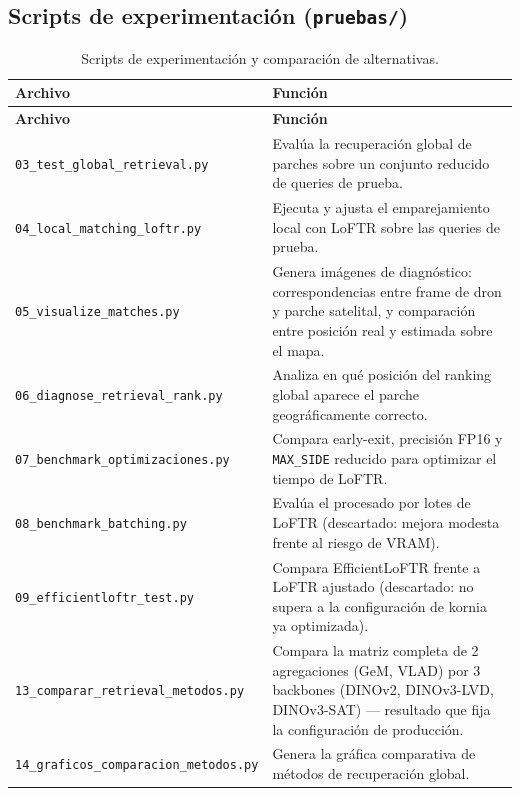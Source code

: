 \subsection*{Scripts de experimentación (\texttt{pruebas/})}

\begin{longtable}{p{}p{}}
\caption{Scripts de experimentación y comparación de alternativas.}\label{tab:scripts-pruebas}\\
\toprule
\textbf{Archivo} & \textbf{Función} \\
\midrule
\endfirsthead
\toprule
\textbf{Archivo} & \textbf{Función} \\
\midrule
\endhead
\texttt{03\_test\_global\_\newline retrieval.py} & Evalúa la recuperación global de parches sobre un conjunto reducido de queries de prueba. \\
\texttt{04\_local\_matching\_\newline loftr.py} & Ejecuta y ajusta el emparejamiento local con LoFTR sobre las queries de prueba. \\
\texttt{05\_visualize\_matches.py} & Genera imágenes de diagnóstico: correspondencias entre frame de dron y parche satelital, y comparación entre posición real y estimada sobre el mapa. \\
\texttt{06\_diagnose\_retrieval\_\newline rank.py} & Analiza en qué posición del ranking global aparece el parche geográficamente correcto. \\
\texttt{07\_benchmark\_\newline optimizaciones.py} & Compara early-exit, precisión FP16 y \texttt{MAX\_SIDE} reducido para optimizar el tiempo de LoFTR. \\
\texttt{08\_benchmark\_batching.py} & Evalúa el procesado por lotes de LoFTR (descartado: mejora modesta frente al riesgo de VRAM). \\
\texttt{09\_efficientloftr\_\newline test.py} & Compara EfficientLoFTR frente a LoFTR ajustado (descartado: no supera a la configuración de kornia ya optimizada). \\
\texttt{13\_comparar\_retrieval\_\newline metodos.py} & Compara la matriz completa de 2 agregaciones (GeM, VLAD) por 3 backbones (DINOv2, DINOv3-LVD, DINOv3-SAT) — resultado que fija la configuración de producción. \\
\texttt{14\_graficos\_comparacion\_\newline metodos.py} & Genera la gráfica comparativa de métodos de recuperación global. \\

\end{longtable}
